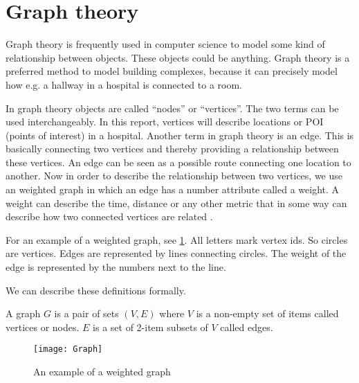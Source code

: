 \section{Graph theory}

Graph theory is frequently used in computer science to model some kind of relationship between objects. These objects could be anything. Graph theory is a preferred method to model building complexes, because it can precisely model how e.g. a hallway in a hospital is connected to a room.

In graph theory objects are called \enquote{nodes} or \enquote{vertices}. The two terms can be used interchangeably. In this report, vertices will describe locations or POI (points of interest) in a hospital. Another term in graph theory is an edge. This is basically connecting two vertices and thereby providing a relationship between these vertices. An edge can be seen as a possible route connecting one location to another. Now in order to describe the relationship between two vertices, we use an weighted graph in which an edge has a number attribute called a weight. A weight can describe the time, distance or any other metric that in some way can describe how two connected vertices are related \cite{wiki_graph_glos,MIT2012}. 

For an example of a weighted graph, see \cref{fig:graph}. All letters mark vertex ids. So circles are vertices. Edges are represented by lines connecting circles. The weight of the edge is represented by the numbers next to the line.

We can describe these definitions formally.\cite{MIT2012}
\begin{mydef}
	A graph $G$ is a pair of sets $(V,E)$ where $V$ is a non-empty set of items called vertices or nodes. $E$ is a set of 2-item subsets of $V$ called edges.
\end{mydef}

  \begin{figure}[ht!]
    \centering
    \texttt{[image: Graph]}
    \caption{An example of a weighted graph}
    \label{fig:graph}
  \end{figure}


